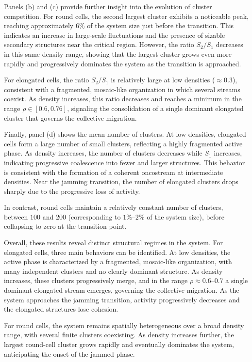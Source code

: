 \documentclass[%
reprint,
amsmath,amssymb,
aps,
]{revtex4-2}
\begin{document}
	Panels (b) and (c) provide further insight into the evolution of cluster competition. For round cells, the second largest cluster exhibits a noticeable peak, reaching approximately $6\%$ of the system size just before the transition. This indicates an increase in large-scale fluctuations and the presence of sizable secondary structures near the critical region. However, the ratio 
	$S_2/S_1$ decreases in this same density range, showing that the largest cluster grows even more rapidly and progressively dominates the system as the transition is approached.
	
	For elongated cells, the ratio $S_2/S_1$ is relatively large at low densities ($\approx 0.3$), consistent with a fragmented, mosaic-like organization in which several streams coexist. As density increases, this ratio decreases and reaches a minimum in the range $\rho \in [0.6, 0.76]$, signaling the consolidation of a single dominant elongated cluster that governs the collective migration.
	
	Finally, panel (d) shows the mean number of clusters. At low densities, elongated cells form a large number of small clusters, reflecting a highly fragmented active phase. As density increases, the number of clusters decreases while $S_1$ increases, indicating progressive coalescence into fewer and larger structures. This behavior is consistent with the formation of a coherent oncostream at intermediate densities. Near the jamming transition, the number of elongated clusters drops sharply due to the progressive loss of activity. 
	
	In contrast, round cells maintain a relatively constant number of clusters, between $100$ and $200$ (corresponding to $1\%$–$2\%$ of the system size), before collapsing to zero at the transition point.

	
	Overall, these results reveal distinct structural regimes in the system. For elongated cells, three main behaviors can be identified. At low densities, the active phase is characterized by a fragmented, mosaic-like organization, with many independent clusters and no clearly dominant structure. As density increases, these clusters progressively merge, and in the range $\rho \approx 0.6–0.7$ a single dominant elongated stream emerges, governing the collective migration. As the system approaches the jamming transition, activity progressively decreases and the elongated structures lose cohesion.
	
	For round cells, the system remains spatially heterogeneous over a broad density range, with several finite clusters coexisting. As density increases further, the largest round-cell cluster grows rapidly and eventually dominates the system, anticipating the onset of the jammed phase.
	
\end{document}
